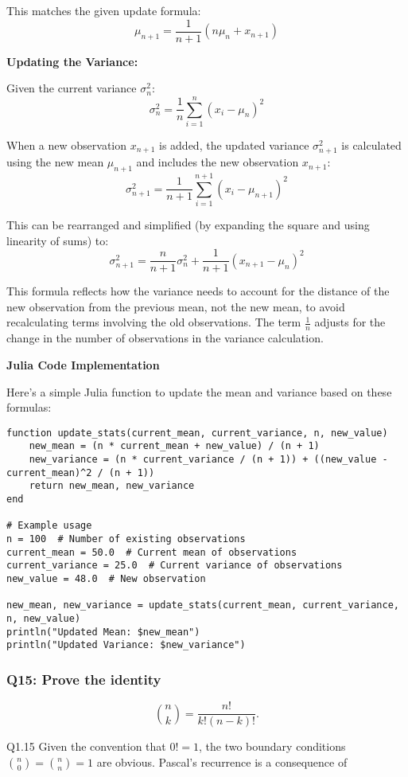 \documentclass[8pt]{article}
\begin{document}
This matches the given update formula:
\[ \mu_{n+1} = \frac{1}{n+1} (n\mu_n + x_{n+1}) \]

\textbf{Updating the Variance:}

Given the current variance \(\sigma_n^2\):
\[ \sigma_n^2 = \frac{1}{n} \sum_{i=1}^n (x_i - \mu_n)^2 \]

When a new observation \(x_{n+1}\) is added, the updated variance \(\sigma_{n+1}^2\) is calculated using the new mean \(\mu_{n+1}\) and includes the new observation \(x_{n+1}\):
\[ \sigma_{n+1}^2 = \frac{1}{n+1} \sum_{i=1}^{n+1} (x_i - \mu_{n+1})^2 \]

This can be rearranged and simplified (by expanding the square and using linearity of sums) to:
\[ \sigma_{n+1}^2 = \frac{n}{n+1} \sigma_n^2 + \frac{1}{n+1} (x_{n+1} - \mu_n)^2 \]

This formula reflects how the variance needs to account for the distance of the new observation from the previous mean, not the new mean, to avoid recalculating terms involving the old observations. The term \(\frac{1}{n}\) adjusts for the change in the number of observations in the variance calculation.

\textbf{Julia Code Implementation}

Here's a simple Julia function to update the mean and variance based on these formulas:

\begin{verbatim}
function update_stats(current_mean, current_variance, n, new_value)
    new_mean = (n * current_mean + new_value) / (n + 1)
    new_variance = (n * current_variance / (n + 1)) + ((new_value - current_mean)^2 / (n + 1))
    return new_mean, new_variance
end

# Example usage
n = 100  # Number of existing observations
current_mean = 50.0  # Current mean of observations
current_variance = 25.0  # Current variance of observations
new_value = 48.0  # New observation

new_mean, new_variance = update_stats(current_mean, current_variance, n, new_value)
println("Updated Mean: $new_mean")
println("Updated Variance: $new_variance")
\end{verbatim}

\subsubsection*{Q15: Prove the identity}
\[
\binom{n}{k} = \frac{n!}{k!(n-k)!}.
\]

Q1.15 Given the convention that \(0! = 1\), the two boundary conditions \(\binom{n}{0} = \binom{n}{n} = 1\) are obvious. Pascal’s recurrence is a consequence of
\end{document}
